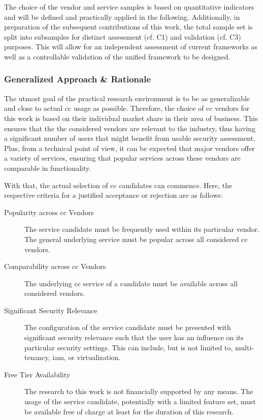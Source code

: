 The choice of the vendor and service samples is based on quantitative indicators and will be defined and practically applied in the following. Additionally, in preparation of the subsequent contributions of this work, the total sample set is split into subsamples for distinct assessment (cf. C1) and validation (cf. C3) purposes. This will allow for an independent assessment of current frameworks as well as a controllable validation of the unified framework to be designed. 

\subsubsection{Generalized Approach \& Rationale}

The utmost goal of the practical research environment is to be as generalizable and close to actual \ac{cc} usage as possible. Therefore, the choice of \ac{cc} vendors for this work is based on their individual market share in their area of business. This ensures that the the considered vendors are relevant to the industry, thus having a significant number of users that might benefit from usable security assessment. Plus, from a technical point of view, it can be expected that major vendors offer a variety of services, ensuring that popular services across these vendors are comparable in functionality.

With that, the actual selection of \ac{cc} candidates can commence. Here, the respective criteria for a justified acceptance or rejection are as follows:

\begin{description}
	\item[Popularity across \ac{cc} Vendors] The service candidate must be frequently used within its particular vendor. The general underlying service must be popular across all considered \ac{cc} vendors.
	\item[Comparability across \ac{cc} Vendors] The underlying \ac{cc} service of a candidate must be available across all considered vendors.
	\item[Significant Security Relevance] The configuration of the service candidate must be presented with significant security relevance such that the user has an influence on its particular security settings. This can include, but is not limited to, multi-tenancy, \ac{iam}, or virtualization.
	\item[Free Tier Availability] The research to this work is not financially supported by any means. The usage of the service candidate, potentially with a limited feature set, must be available free of charge at least for the duration of this research.
\end{description}

